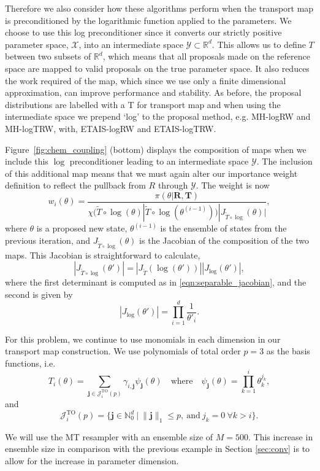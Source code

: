 \documentclass[final]{siamltex}
\begin{document}
Therefore we also consider how these algorithms perform when the transport map
is preconditioned by the logarithmic function applied to the parameters. We choose to use this log
preconditioner since it converts our strictly positive parameter
space, $\mathcal{X}$, into an intermediate space $\mathcal{Y} \subset
\mathbb{R}^d$. This allows us to define $T$ between two subsets of
$\mathbb{R}^d$, which means that all proposals made on the reference
space are mapped to valid
proposals on the true parameter space. It also reduces the work required of the map, which since
we use only a finite dimensional approximation, can improve
performance and stability. As before, the proposal distributions are labelled with a T for transport map and when using the intermediate space we prepend `log' to the proposal method, e.g. MH-logRW and MH-logTRW, with, ETAIS-logRW and ETAIS-logTRW.

Figure~\ref{fig:chem_coupling} (bottom) displays the composition of maps
when we include this $\log$ preconditioner leading to an intermediate space $\mathcal{Y}$. The inclusion of this additional map means that we must again alter our importance weight definition to reflect the pullback from $R$ through $\mathcal{Y}$. The weight is now
\[
	w_i(\theta) = \frac{\pi(\theta|\mathbf{R},\mathbf{T})}{\chi(\tilde{T}\circ\log(\theta)|\tilde{T}\circ\log(\theta^{(i-1)}))|J_{\tilde{T}\circ\log}(\theta)|},
\]
where $\theta$ is a proposed new state, $\theta^{(i-1)}$ is the ensemble of states from the previous iteration, and $J_{\tilde{T}\circ\log}(\theta)$ is the Jacobian of the composition of the two maps. This Jacobian is straightforward to calculate,
\[
	|J_{\tilde{T}\circ\log}(\theta')| = |J_{\tilde{T}}(\log(\theta'))||J_{\log}(\theta')|,
\]
where the first determinant is computed as in
\eqref{eqn:separable_jacobian}, and the second is given by
\[
	|J_{\log}(\theta')| = \prod\limits_{i=1}^d \frac{1}{\theta'_i}.
\]

For this problem, we continue to use monomials in each dimension in our transport map construction. We use polynomials of total order $p=3$ as the basis functions, i.e.
\[
	T_i(\theta) = \sum_{\mathbf{j}\in\mathcal{J}^{\text{TO}}_i(p)} \gamma_{i,\mathbf{j}}\psi_{\mathbf{j}}(\theta) \quad \text{where} \quad \psi_\mathbf{j}(\theta) = \prod\limits_{k=1}^i \theta_k^{j_k},
\]
and
\[
	\mathcal{J}^{\text{TO}}_i(p) = \{\mathbf{j} \in \mathbb{N}^d_0\ |\ \|\mathbf{j}\|_1 \leq p, \ \text{and}\ j_k = 0\ \forall k > i\}.
\]

We will use the MT\cite{russ2017parallel} resampler with an ensemble size of
$M=500$. This increase in ensemble size in comparison with the previous
example in Section \ref{sec:conv} is to allow for the increase in parameter dimension.
\end{document}
